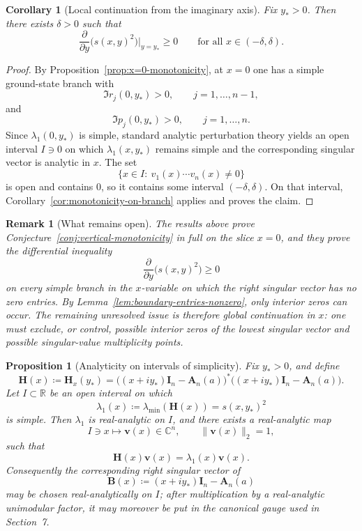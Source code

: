\documentclass[11pt]{article}
\newtheorem{proposition}[theorem]{Proposition}
\newtheorem{corollary}[theorem]{Corollary}
\newtheorem{remark}[theorem]{Remark}
\begin{document}
\begin{corollary}[Local continuation from the imaginary axis]\label{cor:local-continuation-from-x0}
Fix \(y_*>0\). Then there exists \(\delta>0\) such that
\[
\frac{\partial}{\partial y}\bigl(s(x,y)^2\bigr)\Big|_{y=y_*}\ge 0
\qquad
\text{for all }x\in(-\delta,\delta).
\]
\end{corollary}

\begin{proof}
By Proposition~\ref{prop:x=0-monotonicity}, at \(x=0\) one has a simple ground-state branch with
\[
\Im r_j(0,y_*)>0,
\qquad
j=1,\dots,n-1,
\]
and
\[
\Im p_j(0,y_*)>0,
\qquad
j=1,\dots,n.
\]
Since \(\lambda_1(0,y_*)\) is simple, standard analytic perturbation theory yields an open interval \(I\ni 0\) on which \(\lambda_1(x,y_*)\) remains simple and the corresponding singular vector is analytic in \(x\). The set
\[
\{x\in I:\ v_1(x)\cdots v_n(x)\neq 0\}
\]
is open and contains \(0\), so it contains some interval \((-\delta,\delta)\). On that interval, Corollary~\ref{cor:monotonicity-on-branch} applies and proves the claim.
\end{proof}

\begin{remark}[What remains open]\label{rem:remaining-gap-monotonicity}
The results above prove Conjecture~\ref{conj:vertical-monotonicity} in full on the slice \(x=0\), and they prove the differential inequality
\[
\frac{\partial}{\partial y}\bigl(s(x,y)^2\bigr)\ge 0
\]
on every simple branch in the \(x\)-variable on which the right singular vector has no zero entries. By Lemma~\ref{lem:boundary-entries-nonzero}, only interior zeros can occur. The remaining unresolved issue is therefore global continuation in \(x\): one must exclude, or control, possible interior zeros of the lowest singular vector and possible singular-value multiplicity points.
\end{remark}


\begin{proposition}[Analyticity on intervals of simplicity]\label{prop:analyticity-on-simple-interval}
Fix \(y_*>0\), and define
\[
\mathbf H(x)\coloneqq \mathbf H_x(y_*)
=
\bigl((x+iy_*)\mathbf I_n-\mathbf A_n(a)\bigr)^*
\bigl((x+iy_*)\mathbf I_n-\mathbf A_n(a)\bigr).
\]
Let \(I\subset\mathbb R\) be an open interval on which
\[
\lambda_1(x)\coloneqq \lambda_{\min}(\mathbf H(x))=s(x,y_*)^2
\]
is simple. Then \(\lambda_1\) is real-analytic on \(I\), and there exists a real-analytic map
\[
I\ni x\longmapsto \mathbf v(x)\in\mathbb C^n,
\qquad
\|\mathbf v(x)\|_2=1,
\]
such that
\[
\mathbf H(x)\mathbf v(x)=\lambda_1(x)\mathbf v(x).
\]
Consequently the corresponding right singular vector of
\[
\mathbf B(x)\coloneqq (x+iy_*)\mathbf I_n-\mathbf A_n(a)
\]
may be chosen real-analytically on \(I\); after multiplication by a real-analytic unimodular factor, it may moreover be put in the canonical gauge used in Section~7.
\end{proposition}
\end{document}
